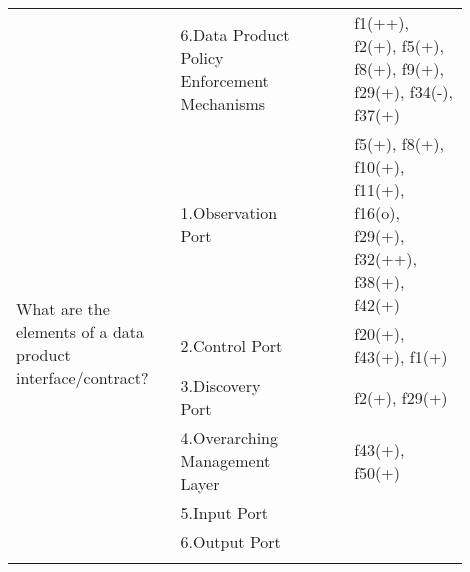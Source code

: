 \begin{tabular}{|p{0.12\linewidth}|p{0.015\linewidth}|p{0.3\linewidth}|p{0.15\linewidth}|p{0.31\linewidth}|}
 & \multirow{-6}{\linewidth}{ \cellcolor{emerald_shape_7}{55}} &6.Data Product Policy Enforcement Mechanisms&\cellcolor{emerald_shape_5}{s1, s3, s4, s5, s6, s12, s15, s20, s23, s27, s31, s32, s36, s38, s39, s40, s43, s47, s52, s56, i5} & f1(++), f2(+), f5(+), f8(+), f9(+), f29(+), f34(-), f37(+)\\
\multirow{6}{\linewidth}{What are the elements of a data product interface/contract?} &\cellcolor{emerald_shape_4}{} &1.Observation Port&\cellcolor{emerald_shape_6}{s3, s7, s11, s13, s22, s52, i2, i3, i4, i6} & f5(+), f8(+), f10(+), f11(+), f16(o), f29(+), f32(++), f38(+), f42(+)\\
 & \cellcolor{emerald_shape_4}{} & 2.Control Port&\cellcolor{emerald_shape_5}{s49, s52, i1, i2, i4, i6} & f20(+), f43(+), f1(+)\\
 & \cellcolor{emerald_shape_4}{} & 3.Discovery Port&\cellcolor{emerald_shape_5}{s20, s25, s49, s52, i3, i4} & f2(+), f29(+)\\
 & \cellcolor{emerald_shape_4}{} & 4.Overarching Management Layer&\cellcolor{emerald_shape_4}{i1, i2, i6} & f43(+), f50(+)\\
 & \cellcolor{emerald_shape_4}{} & 5.Input Port&\cellcolor{emerald_shape_2}{i4} & \\
 & \multirow{-6}{\linewidth}{ \cellcolor{emerald_shape_4}{15}} &6.Output Port&\cellcolor{emerald_shape_2}{i4} & \\
\hline
\multicolumn{5}{l}{\parbox{\textwidth}{\smallskip
}}
\end{tabular}
